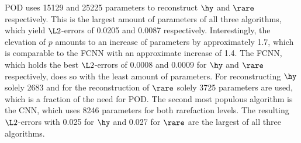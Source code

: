 POD uses 15129 and 25225 parameters to reconstruct \(\hy\) and \(\rare\) respectively. This is the largest amount of parameters of all three algorithms, which yield \(\L2\)-errors of 0.0205 and 0.0087 respectively. Interestingly, the elevation of \(p\) amounts to an increase of parameters by approximately 1.7, which is comparable to the FCNN with an approximate increase of 1.4. The FCNN, which holds the best \(\L2\)-errors of 0.0008 and 0.0009 for \(\hy\) and \(\rare\) respectively, does so with the least amount of parameters. For reconstructing \(\hy\) solely 2683 and for the reconstruction of \(\rare\) solely 3725 parameters are used, which is a fraction of the need for POD. The second most populous algorithm is the CNN, which uses 8246 parameters for both rarefaction levels. The resulting \(\L2\)-errors with 0.025 for \(\hy\) and 0.027 for \(\rare\) are the largest of all three algorithms. \\

